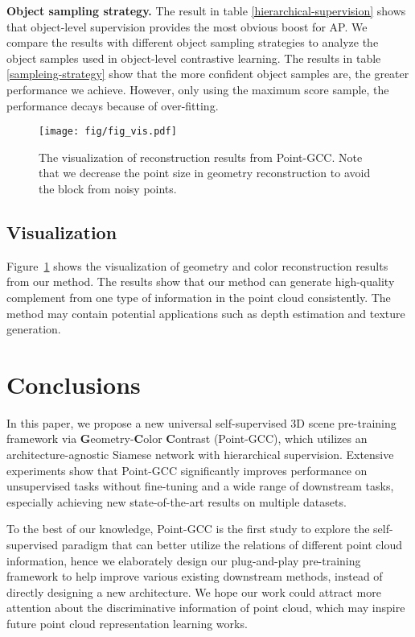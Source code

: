 \documentclass{article}
\begin{document}
\textbf{Object sampling strategy.} The result in table \ref{hierarchical-supervision} shows that object-level supervision provides the most obvious boost for AP. We compare the results with different object sampling strategies to analyze the object samples used in object-level contrastive learning. The results in table \ref{sampleing-strategy} show that the more confident object samples are, the greater performance we achieve. However, only using the maximum score sample, the performance decays because of over-fitting.
\begin{figure}
  \centering
  \vspace{-0.2cm}
  \texttt{[image: fig/fig\_vis.pdf]}
  \vspace{-0.2cm}
  \caption{The visualization of reconstruction results from Point-GCC. Note that we decrease the point size in geometry reconstruction to avoid the block from noisy points.}
\label{fig:vis}
\end{figure} \subsection{Visualization}
\label{visualization}
\vspace{-0.25cm}
Figure~\ref{fig:vis} shows the visualization of geometry and color reconstruction results from our method. The results show that our method can generate high-quality complement from one type of information in the point cloud consistently. The method may contain potential applications such as depth estimation and texture generation. \section{Conclusions}
\vspace{-0.2cm}
In this paper, we propose a new universal self-supervised 3D scene pre-training framework via \textbf{G}eometry-\textbf{C}olor \textbf{C}ontrast (Point-GCC), which utilizes an architecture-agnostic Siamese network with hierarchical supervision. Extensive experiments show that Point-GCC significantly improves performance on unsupervised tasks without fine-tuning and a wide range of downstream tasks, especially achieving new state-of-the-art results on multiple datasets.

To the best of our knowledge, Point-GCC is the first study to explore the self-supervised paradigm that can better utilize the relations of different point cloud information, hence we elaborately design our plug-and-play pre-training framework to help improve various existing downstream methods, instead of directly designing a new architecture. We hope our work could attract more attention about the discriminative information of point cloud, which may inspire future point cloud representation learning works. 
\medskip
\end{document}
